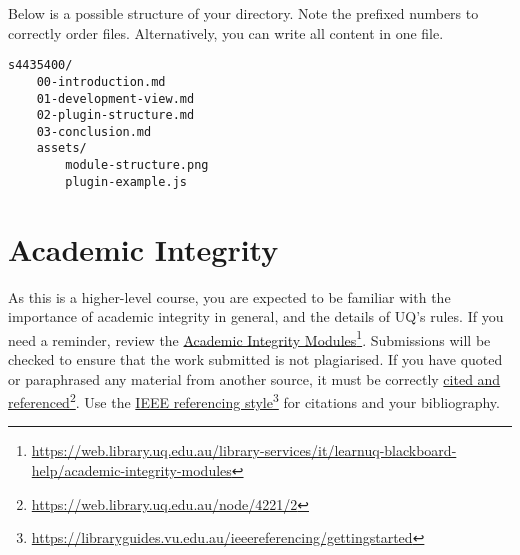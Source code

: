 \documentclass{csse4400}
\begin{document}
Below is a possible structure of your directory. Note the prefixed numbers to correctly order files.
Alternatively, you can write all content in one file.

\begin{verbatim}
s4435400/
    00-introduction.md
    01-development-view.md
    02-plugin-structure.md
    03-conclusion.md
    assets/
        module-structure.png
        plugin-example.js
\end{verbatim}

\section{Academic Integrity}
As this is a higher-level course, you are expected to be familiar with the importance of academic integrity in general, and the details of UQ's rules.
If you need a reminder, review the \href{https://web.library.uq.edu.au/library-services/it/learnuq-blackboard-help/academic-integrity-modules}
{Academic Integrity Modules}\footnote{\url{https://web.library.uq.edu.au/library-services/it/learnuq-blackboard-help/academic-integrity-modules}}.
Submissions will be checked to ensure that the work submitted is not plagiarised.
If you have quoted or paraphrased any material from another source, it must be correctly \href{https://web.library.uq.edu.au/node/4221/2}
{cited and referenced}\footnote{\url{https://web.library.uq.edu.au/node/4221/2}}.
Use the \href{https://libraryguides.vu.edu.au/ieeereferencing/gettingstarted}
{IEEE referencing style}\footnote{\url{https://libraryguides.vu.edu.au/ieeereferencing/gettingstarted}} for citations and your bibliography.
\end{document}
